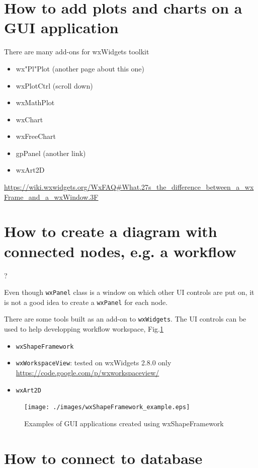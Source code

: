 \section{How to add plots and charts on a GUI application}


There are many add-ons for wxWidgets toolkit 
\begin{itemize}
\item wx"Pl"Plot (another page about this one)
\item wxPlotCtrl (scroll down)
\item wxMathPlot
\item wxChart
\item wxFreeChart
\item gpPanel (another link)
\item wxArt2D
\end{itemize}
\url{https://wiki.wxwidgets.org/WxFAQ#What.27s_the_difference_between_a_wxFrame_and_a_wxWindow.3F} 

\section{How to create a diagram with connected nodes, e.g. a workflow}?

Even though \verb!wxPanel! class is a window on which other UI controls are put on, it is not a good idea 
to create a \verb!wxPanel! for each node.

There are some tools built as an add-on to \verb!wxWidgets!.
The UI controls can be used to help developping workflow workspace,
Fig.\ref{fig:wxShapeFramework_example}

\begin{itemize}
  \item \verb!wxShapeFramework!
  \item \verb!wxWorkspaceView!: tested on wxWidgets 2.8.0 only
  \url{https://code.google.com/p/wxworkspaceview/}
  
  \item \verb!wxArt2D!
\end{itemize}



\begin{figure}[hbt]
  \centerline{\texttt{[image: ./images/wxShapeFramework\_example.eps]}}
\caption{Examples of GUI applications created using wxShapeFramework}
\label{fig:wxShapeFramework_example}
\end{figure}


\section{How to connect to database}

